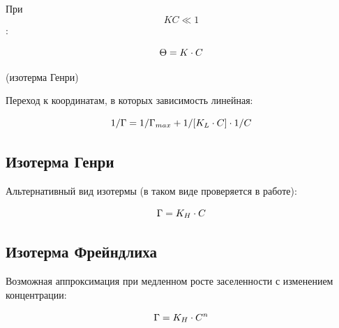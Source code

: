 \documentclass[a4paper]{article}
\begin{document}
При \[ K C \ll 1 \]:
\par \vspace{0.3 cm}

\begin{center}
\[

\LARGE \Theta = K \cdot C

\]

\par \vspace{0.3 cm}
(изотерма Генри)
\end{center}



Переход к координатам, в которых зависимость линейная:
\par 
\vspace{0.3 cm}

\begin{center}
\[

\LARGE 1/\Gamma = 1/\Gamma_{max} + 1/[K_L \cdot C] \cdot 1/C


\]
\end{center}

\subsection{\large{Изотерма Генри}} 
\par

Альтернативный вид изотермы (в таком виде проверяется в работе):
\par 
\vspace{0.3 cm}

\begin{center}
\[

\LARGE \Gamma = K_H \cdot C


\]
\end{center}


\subsection{\large{Изотерма Фрейндлиха}} 
\par

Возможная аппроксимация при медленном росте заселенности с изменением концентрации:

\par \vspace{0.3 cm}

\begin{center}
\[

\LARGE \Gamma = K_H \cdot C^n


\]
\end{center}
\end{document}
